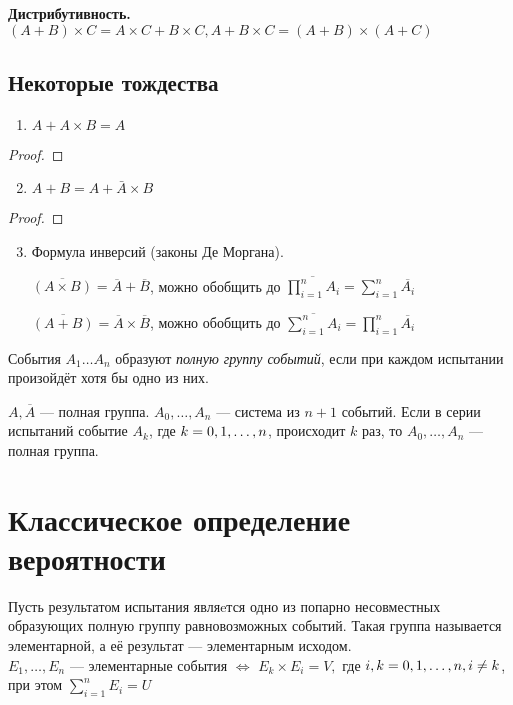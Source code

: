   \textbf{Дистрибутивность.} $(A + B)\times C = A\times C + B\times C,  A + B\times C = (A + B)\times (A + C)$

\subsection{Некоторые тождества}
\begin{enumerate}
  \item $A + A\times B = A$
\end{enumerate}
\begin{proof}
\end{proof}

\begin{enumerate}
  \setcounter{enumi}{1}
\item{$A + B = A + \bar{A}\times B$}
\end{enumerate}
\begin{proof}
\end{proof}

\begin{enumerate}
\setcounter{enumi}{2}
\item Формула инверсий (законы Де Моргана).
\smallskip

  $\overline{(A\times B)} = \overline{A} + \overline{B}$, можно обобщить до $\overline{\prod\limits_{i=1}^n A_i} = \sum\limits_{i=1}^n \overline{A_i} $

  $\overline{(A + B)} = \overline{A}\times \overline{B}$, можно обобщить до $\overline{\sum\limits_{i=1}^n A_i} = \prod\limits_{i=1}^n \overline{A_i} $
\end{enumerate}
 События $A_1 \dots A_n$ образуют \textit{полную группу событий}, если при каждом испытании произойдёт хотя бы одно из них.
\smallskip

\example $A, \overline{A}$ --- полная группа.
\example $A_0, \ldots, A_n$ --- система из $n+1$ событий. Если в серии испытаний событие $A_k$, где $k = 0,1,\dots,n$, происходит $k$ раз, то $A_0, \ldots, A_n$ --- полная группа.

\section{Классическое определение вероятности}
Пусть результатом испытания являeтся одно из попарно несовместных образующих полную группу равновозможных событий. Такая группа называется элементарной, а её результат --- элементарным исходом. \\
$E_1, \dots, E_n$ --- элементарные события $\Leftrightarrow$ $E_k\times E_i = V,$ где $i, k = 0,1,\dots,n, i \not= k$, при этом $\sum\limits_{i = 1}^n E_i = U$

